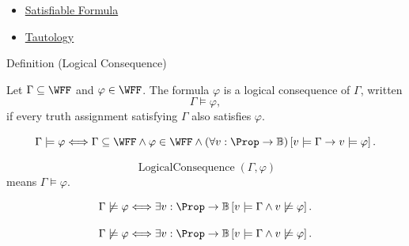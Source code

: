 \begin{dependencies}
\begin{itemize}
  \item \hyperref[def:satisfiable-formula-propositional-logic]{Satisfiable Formula}
  \item \hyperref[def:tautology-propositional-logic]{Tautology}
\end{itemize}
\end{dependencies}
\begin{definitionbox}{Definition (Logical Consequence)}
\begin{definition}
\label{def:logical-consequence-propositional-logic}
Let \(\Gamma\subseteq\WFF\) and \(\varphi\in\WFF\). The formula \(\varphi\) is a logical consequence of \(\Gamma\), written
\[
\Gamma\models\varphi,
\]
if every truth assignment satisfying \(\Gamma\) also satisfies \(\varphi\).
\end{definition}
\end{definitionbox}

\begin{remark*}
\[
\Gamma\models\varphi
\Longleftrightarrow
\Gamma\subseteq\WFF
\land
\varphi\in\WFF
\land
(\forall v:\Prop\to\mathbb{B})
\left[
v\models\Gamma\to v\models\varphi
\right].
\]
\end{remark*}

\begin{remark*}
\[
\operatorname{LogicalConsequence}(\Gamma,\varphi)
\]
means \(\Gamma\models\varphi\).
\end{remark*}

\begin{remark*}
\[
\Gamma\not\models\varphi
\Longleftrightarrow
\exists v:\Prop\to\mathbb{B}
\left[
v\models\Gamma
\land
v\not\models\varphi
\right].
\]
\end{remark*}

\begin{remark*}
\[
\Gamma\not\models\varphi
\Longleftrightarrow
\exists v:\Prop\to\mathbb{B}
\left[
v\models\Gamma
\land
v\not\models\varphi
\right].
\]
\end{remark*}

